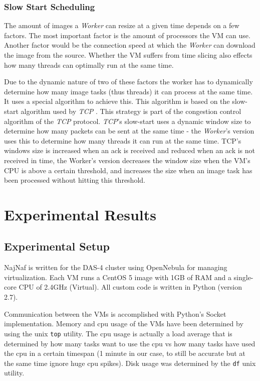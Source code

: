 \documentclass[10pt,journal,compsoc]{IEEEtran}
\begin{document}
\subsubsection{Slow Start Scheduling}
\label{sssec:slow-start}
The amount of images a \emph{Worker} can resize at a given time depends on a few
factors. The most important factor is the amount of processors the VM can use.
Another factor would be the connection speed at which the \emph{Worker} can
download the image from the source. Whether the VM suffers from time slicing
also effects how many threads can optimally run at the same time.

Due to the dynamic nature of two of these factors the worker has to dynamically
determine how many image tasks (thus threads) it can process at the same time. It
uses a special algorithm to achieve this. This algorithm is based on the
slow-start algorithm used by \emph{TCP} \cite{slow-start}. This strategy is part
of the congestion control algorithm of the \emph{TCP} protocol. \emph{TCP}'s
slow-start uses a dynamic window size to determine how many packets can be sent
at the same time - the \emph{Worker}'s version uses this to determine how many
threads it can run at the same time. TCP's windows size is increased when an ack
is received and reduced when an ack is not received in time, the Worker's
version decreases the window size when the VM's CPU is above a certain
threshold, and increases the size when an image task has been processed without
hitting this threshold.

\section{Experimental Results}
\label{sec:Experimental Results}
\subsection{Experimental Setup}
\label{ssec:Experimental Setup}
NajNaf is written for the DAS-4 cluster using OpenNebula \cite{opennebula} for
managing virtualization.  Each VM runs a CentOS 5 image with 1GB of RAM and a
single-core CPU of 2.4GHz (Virtual).
All custom code is written in Python (version 2.7).

Communication between the VMs is accomplished with Python's Socket implementation.
Memory and cpu usage of the VMs have been determined by using the unix
\texttt{top} utility. The cpu usage is actually a load average that is
determined by how many tasks want to use the cpu vs how many tasks have used the
cpu in a certain timespan (1 minute in our case, to still be accurate but at the
same time ignore huge cpu spikes). Disk usage was determined by the \texttt{df}
unix utility.
\end{document}
